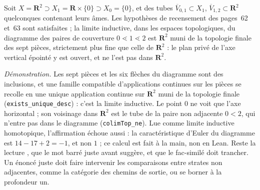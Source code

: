 \begin{encadre}
\begin{contrexemple}
Soit $X = \mathbf R^2 \supset X_1 = \mathbf R \times \{0\} \supset X_0 = \{0\}$, et des tubes $\overline V_{0,1} \subset X_1$, $\overline V_{1,2} \subset \mathbf R^2$ quelconques contenant leurs âmes. Les hypothèses de recensement des pages~62 et~63 sont satisfaites ; la limite inductive, dans les espaces topologiques, du diagramme des paires de couverture $0 \lessdot 1 \lessdot 2$ est $\mathbf R^2$ muni de la topologie finale des sept pièces, strictement plus fine que celle de $\mathbf R^2$ : le plan privé de l'axe vertical épointé y est ouvert, et ne l'est pas dans $\mathbf R^2$.
\end{contrexemple}
\end{encadre}
{\small \emph{Démonstration.} Les sept pièces et les six flèches du diagramme sont des inclusions, et une famille compatible d'applications continues sur les pièces se recolle en une unique application continue sur $\mathbf R^2$ muni de la topologie finale (\texttt{exists\_unique\_desc}) : c'est la limite inductive. Le point $0$ ne voit que l'axe horizontal ; son voisinage dans $\mathbf R^2$ est le tube de la paire non adjacente $0 < 2$, qui n'entre pas dans le diagramme (\texttt{colimTop\_ne}). Lue comme limite inductive homotopique, l'affirmation échoue aussi : la caractéristique d'Euler du diagramme est $14 - 17 + 2 = -1$, et non $1$ ; ce calcul est fait à la main, non en Lean. Reste la lecture , que le mot barré juste avant suggère, et que le fac-similé doit trancher. Un énoncé juste doit faire intervenir les comparaisons entre strates non adjacentes, comme la catégorie des chemins de sortie, ou se borner à la profondeur un.\par}

